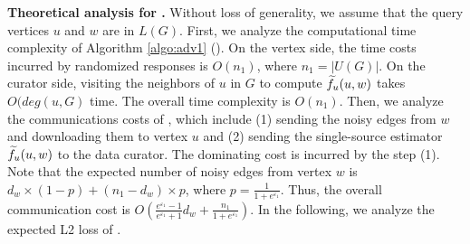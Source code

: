 \noindent
{\bf Theoretical analysis for \advss.} 
{
Without loss of generality, we assume that the query vertices $u$ and $w$ are in $L(G)$. 
First, we analyze the computational time complexity of Algorithm \ref{algo:adv1} (\advss). On the vertex side, the time costs incurred by randomized responses is $O(n_1)$, where $n_1 = |U(G)|$. On the curator side, visiting the neighbors of $u$ in $G$ to compute $\widetilde{f}_u(u, w)$ takes $O(deg(u, G) $ time. The overall time complexity is $O(n_1)$. 
Then, we analyze the communications costs of \advss, which include (1) sending the noisy edges from $w$ and downloading them to vertex $u$ and (2) sending the single-source estimator $\widetilde{f}_u(u, w)$ to the data curator. 
The dominating cost is incurred by the step (1). 
Note that the expected number of noisy edges from vertex $w$ is $d_w \times (1-p) + (n_1 - d_w) \times p$, where $p = \frac{1}{1 + e^{\varepsilon_1}}$. 
Thus, the overall communication cost is $O(\frac{e^{\varepsilon_1}-1}{e^{\varepsilon_1}+1}d_w + \frac{ n_1}{1 + e^{\varepsilon_1}} )$. 
In the following, we analyze the expected L2 loss of \advss. }

